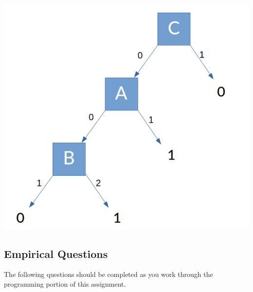 \documentclass[11pt,addpoints,answers]{exam}
\begin{document}
\begin{questions}
    \begin{your_solution}[title=Decision Tree,height=18cm,width=15cm]
    \begin{center}
    \includegraphics[width=14cm]{../code/plots/decision_tree_q8.png}
    \end{center}


    \end{your_solution}
    
\end{questions}

\clearpage

\subsection{Empirical Questions}

The following questions should be completed as you work through the programming portion of this assignment.
\end{document}
